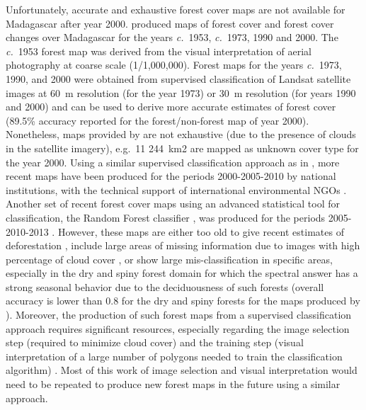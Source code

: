 \documentclass[a4paper, 12pt, leqno]{article}\usepackage[]{graphicx}\usepackage[]{color}
\begin{document}
Unfortunately, accurate and exhaustive forest cover maps are not
available for Madagascar after year 2000. \citet{Harper2007} produced
maps of forest cover and forest cover changes over Madagascar for the
years \emph{c.}~1953, \emph{c.}~1973, 1990 and 2000. The
\emph{c.}~1953 forest map was derived from the visual interpretation
of aerial photography at coarse scale (1/1,000,000). Forest maps for
the years \emph{c.}~1973, 1990, and 2000 were obtained from supervised
classification of Landsat satellite images at 60~m resolution (for the
year 1973) or 30~m resolution (for years 1990 and 2000) and can be
used to derive more accurate estimates of forest cover (89.5\%
accuracy reported for the forest/non-forest map of year
2000). Nonetheless, maps provided by \citet{Harper2007} are not
exhaustive (due to the presence of clouds in the satellite imagery),
e.g.~11 244~km2 are mapped as unknown cover type for the year
2000. Using a similar supervised classification approach as in
\citet{Harper2007}, more recent maps have been produced for the
periods 2000-2005-2010 by national institutions, with the technical
support of international environmental NGOs \citep{MEFT2009,
  ONE2013}. Another set of recent forest cover maps using an advanced
statistical tool for classification, the Random Forest classifier
\citep{Grinand2013, Rakotomalala2015}, was produced for the periods
2005-2010-2013 \citep{ONE2015}. However, these maps are either too old
to give recent estimates of deforestation \citep{MEFT2009, ONE2013},
include large areas of missing information due to images with high
percentage of cloud cover \citep{ONE2013}, or show large
mis-classification in specific areas, especially in the dry and spiny
forest domain for which the spectral answer has a strong seasonal
behavior due to the deciduousness of such forests (overall accuracy is
lower than 0.8 for the dry and spiny forests for the maps produced by
\citet{ONE2015}). Moreover, the production of such forest maps from a
supervised classification approach requires significant resources,
especially regarding the image selection step (required to minimize
cloud cover) and the training step (visual interpretation of a large
number of polygons needed to train the classification algorithm)
\citep{Rakotomalala2015}. Most of this work of image selection and
visual interpretation would need to be repeated to produce new forest
maps in the future using a similar approach.
\end{document}
